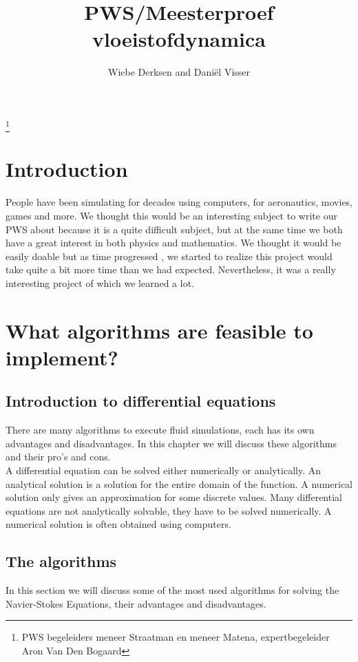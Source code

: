 \documentclass{article}
\title{PWS/Meesterproef vloeistofdynamica}
\author{Wiebe Derksen and Daniël Visser}
\begin{document}
\maketitle
\thispagestyle{empty}
\hfil
\thanks{PWS begeleiders meneer Straatman en meneer Matena, expertbegeleider Aron Van Den Bogaard}
\newpage
\tableofcontents
\newpage
\section{Introduction}
People have been simulating  for decades using computers, for aeronautics, movies, games and more. We thought this would be an interesting subject to write our PWS about because it is a quite difficult subject, but at the same time we both have a great interest in both physics and mathematics. We thought it would be easily doable but as time progressed , we started to realize this project would take quite a bit more time than we had expected. Nevertheless, it was a really interesting project of which we learned a lot. 

\newpage
\section{What algorithms are feasible to implement?}
\subsection{Introduction to differential equations}
There are many algorithms to execute fluid simulations, each has its own advantages and disadvantages. In this chapter we will discuss these algorithms and their pro's and cons. 
\\

A differential equation can be solved either numerically or analytically. An analytical solution is a solution for the entire domain of the function. A numerical solution only gives an approximation for some discrete values.  Many differential equations are not analytically solvable, they have to be solved numerically. A numerical solution is often obtained using computers. \cite{What is discretization}




\subsection{The algorithms}
In this section we will discuss some of the most used algorithms for solving the Navier-Stokes Equations, their advantages and disadvantages. 
\end{document}
